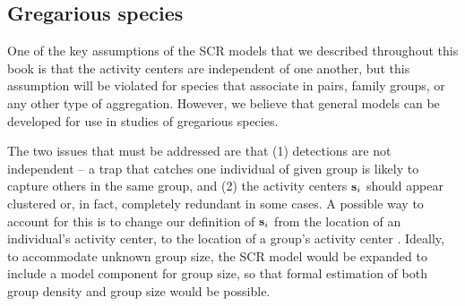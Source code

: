 \subsection{Gregarious species}

One of the key assumptions of the SCR models that we described
throughout this book is that the activity centers are independent of
one another, but this assumption will be violated for species that
associate in pairs, family groups, or any other type of aggregation.
However, we believe that general models can be developed for use in
studies of gregarious species.

The two issues that must be addressed are that (1) detections are not
independent -- a trap that catches one individual of given group is
likely to capture others in the same group, and (2) the activity
centers ${\bf s}_{i}$ should appear clustered or, in fact, completely
redundant in some cases. A possible way to account for this is to
change our definition of ${\bf s}_i$ from the location of an
individual's activity center, to the location of a group's activity
center \citep{russell_etal:2012}. Ideally, to accommodate unknown
group size, the SCR model would be expanded to include a model
component for group size, so that formal estimation of both group
density and group size would be possible.



